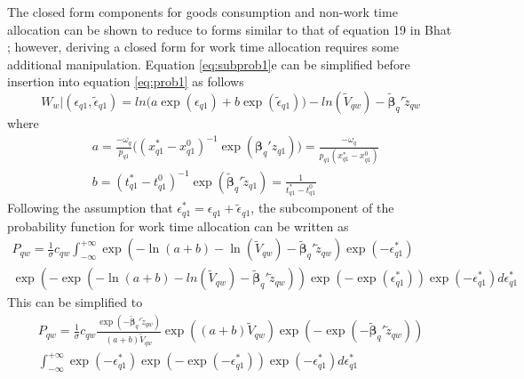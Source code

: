 The closed form components for goods consumption and non-work time allocation can be shown to reduce to forms similar to that of equation 19 in Bhat \cite{Bhat2008TheExtensions}; however, deriving a closed form for work time allocation requires some additional manipulation. Equation \ref{eq:subprob1}e can be simplified before insertion into equation \ref{eq:prob1} as follows
\begin{equation}
    W_w|(\epsilon_{q1},\widetilde{\epsilon}_{q1}) = ln \Bigg( a \exp (\epsilon_{q1}) + b \exp (\widetilde{\epsilon}_{q1})\Bigg) - ln\left(\widetilde{V}_{qw} \right) - \bm{\widetilde{\beta}}_q' \widetilde{z}_{qw}
\end{equation}
where 
\begin{subequations}\label{eq:subprob2}
\begin{align}
        &a = \frac{-\omega_q}{p_{q1}} \Big( (x_{q1}^* - x_{q1}^0)^{-1} \exp (\bm{\beta}_q' z_{q1})\Big) = \frac{-\omega_q}{p_{q1}(x_{q1}^* - x_{q1}^0)} \\
        &b = (t_{q1}^* - t_{q1}^0)^{-1} \exp ( \bm{\widetilde{\beta}}_q' \widetilde{z}_{q1}) = \frac{1}{t_{q1}^* - t_{q1}^0}
\end{align}
\end{subequations}
Following the assumption that $\epsilon_{q1}^* = \epsilon_{q1} + \widetilde{\epsilon}_{q1}$, the subcomponent of the probability function for work time allocation can be written as
\begin{equation}\label{eq:prob2}
    \begin{split} P_{qw} = \frac{1}{\sigma} c_{qw} \int_{-\infty}^{+\infty} \exp\left(-\ln\left(a+b\right)-\ln\left(\widetilde{V}_{qw} \right) - \bm{\widetilde{\beta}}_q' \widetilde{z}_{qw} \right) \exp\left(-\epsilon_{q1}^* \right) \\
    \exp\left(-\exp\left(-\ln\left(a+b\right)-ln\left(\widetilde{V}_{qw} \right) - \bm{\widetilde{\beta}}_q' \widetilde{z}_{qw} \right)\right) \exp\left( - \exp \left(\epsilon_{q1}^* \right)\right) \exp\left(-\epsilon_{q1}^* \right) d\epsilon_{q1}^* \end{split}
\end{equation}
This can be simplified to
\begin{equation}\label{eq:prob3}
    \begin{split} P_{qw} = \frac{1}{\sigma} c_{qw} \frac{\exp \left(- \bm{\widetilde{\beta}}_q' \widetilde{z}_{qw} \right) }{\left(a+b\right)\widetilde{V}_{qw}} \exp\left(\left(a+b\right)\widetilde{V}_{qw}\right) \exp\left( - \exp \left(-\bm{\widetilde{\beta}}_q' \widetilde{z}_{qw} \right)\right) \\  \int_{-\infty}^{+\infty} \exp\left(-\epsilon_{q1}^* \right) \exp\left( - \exp \left(-\epsilon_{q1}^* \right)\right) \exp\left(-\epsilon_{q1}^* \right) d\epsilon_{q1}^* \end{split}
\end{equation}
